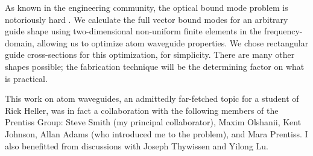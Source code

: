 As known in the engineering community, the
optical bound mode problem is notoriously hard \cite{FEreview}.
We calculate the full vector bound modes for an arbitrary guide shape
using two-dimensional
non-uniform finite elements in the frequency-domain,
allowing us to
optimize atom waveguide properties.
We chose rectangular guide cross-sections for this optimization, for simplicity.
There are many other shapes possible; the fabrication technique will
be the determining factor on what is practical.


This work on atom waveguides, an admittedly far-fetched topic
for a student of Rick Heller,
was in fact a collaboration with the following members of the Prentiss Group:
Steve Smith (my principal collaborator),
Maxim Olshanii,
Kent Johnson,
Allan Adams (who introduced me to the problem), and Mara Prentiss.
I also benefitted from discussions with Joseph Thywissen and Yilong Lu.

